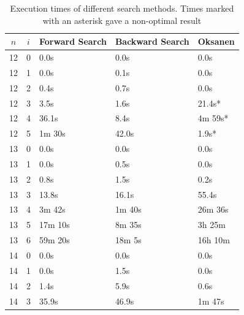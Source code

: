 \documentclass[10pt,journal,compsoc]{IEEEtran}
\begin{document}
\begin{table}[!t]
  \renewcommand{\arraystretch}{1.2}
  \caption{Execution times of different search methods. Times marked with an asterisk gave a non-optimal result}
  \label{table:search_algorithms}
  \centering
  \begin{tabular}{c|c|l|l|l}
    $n$ & $i$ & \textbf{Forward Search} & \textbf{Backward Search} & \textbf{Oksanen} \\
    \hline
    12  & 0   & 0.0s                    & 0.0s                     & 0.0s             \\
    12  & 1   & 0.0s                    & 0.1s                     & 0.0s             \\
    12  & 2   & 0.4s                    & 0.7s                     & 0.0s             \\
    12  & 3   & 3.5s                    & 1.6s                     & 21.4s*           \\
    12  & 4   & 36.1s                   & 8.4s                     & 4m 59s*          \\
    12  & 5   & 1m 30s                  & 42.0s                    & 1.9s*            \\
    \hline
    13  & 0   & 0.0s                    & 0.0s                     & 0.0s             \\
    13  & 1   & 0.0s                    & 0.5s                     & 0.0s             \\
    13  & 2   & 0.8s                    & 1.5s                     & 0.2s             \\
    13  & 3   & 13.8s                   & 16.1s                    & 55.4s            \\
    13  & 4   & 3m 42s                  & 1m 40s                   & 26m 36s          \\
    13  & 5   & 17m 10s                 & 8m 35s                   & 3h 25m           \\
    13  & 6   & 59m 20s                 & 18m 5s                   & 16h 10m          \\
    \hline
    14  & 0   & 0.0s                    & 0.0s                     & 0.0s             \\
    14  & 1   & 0.0s                    & 1.5s                     & 0.0s             \\
    14  & 2   & 1.4s                    & 5.9s                     & 0.6s             \\
    14  & 3   & 35.9s                   & 46.9s                    & 1m 47s           \\

\end{tabular}
\end{table}
\end{document}
